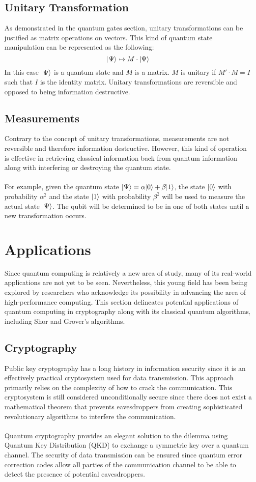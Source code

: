 \documentclass[12pt]{third-rep}
\begin{document}
\section{Unitary Transformation}
As demonstrated in the quantum gates section, unitary transformations can be justified as matrix operations on vectors. This kind of quantum state manipulation can be represented as the following:
$${\left\vert{\Psi}\right\rangle}\mapsto M\cdot{\left\vert{\Psi}\right\rangle}$$
In this case ${\left\vert{\Psi}\right\rangle}$ is a quantum state and $M$ is a matrix. $M$ is unitary if $M'\cdot M=I$ such that $I$ is the identity matrix. Unitary transformations are reversible and opposed to being information destructive.

\section{Measurements}
Contrary to the concept of unitary transformations, measurements are not reversible and therefore information destructive. However, this kind of operation is effective in retrieving classical information back from quantum information along with interfering or destroying the quantum state. \\\\
For example, given the quantum state ${\left\vert{\Psi}\right\rangle}=\alpha{\left\vert{0}\right\rangle}+\beta{\left\vert{1}\right\rangle}$, the state ${\left\vert{0}\right\rangle}$ with probability $\alpha^2$ and the state ${\left\vert{1}\right\rangle}$ with probability $\beta^2$ will be used to measure the actual state ${\left\vert{\Psi}\right\rangle}$. The qubit will be determined to be in one of both states until a new transformation occurs. 

\chapter{Applications}
Since quantum computing is relatively a new area of study, many of its real-world applications are not yet to be seen. Nevertheless, this young field has been being explored by researchers who acknowledge its possibility in advancing the area of high-performance computing. This section delineates potential applications of quantum computing in cryptography along with its classical quantum algorithms, including Shor and Grover's algorithms.

\section{Cryptography}
Public key cryptography has a long history in information security since it is an effectively practical cryptosystem used for data transmission. This approach primarily relies on the complexity of how to crack the communication. This cryptosystem is still considered unconditionally secure since there does not exist a mathematical theorem that prevents eavesdroppers from creating sophisticated revolutionary algorithms to interfere the communication. \\\\
Quantum cryptography provides an elegant solution to the dilemma using Quantum Key Distribution (QKD) to exchange a symmetric key over a quantum channel. The security of data transmission can be ensured since quantum error correction codes allow all parties of the communication channel to be able to detect the presence of potential eavesdroppers.
\end{document}
